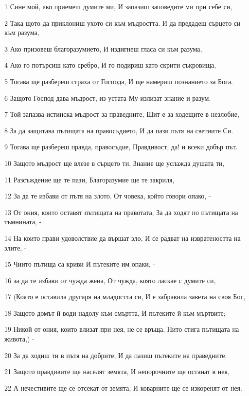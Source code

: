 \par 1 Сине мой, ако приемеш думите ми, И запазиш заповедите ми при себе си,
\par 2 Така щото да приклониш ухото си към мъдростта. И да предадеш сърцето си към разума,
\par 3 Ако призовеш благоразумието, И издигнеш гласа си към разума,
\par 4 Ако го потърсиш като сребро, И го подириш като скрити съкровища,
\par 5 Тогава ще разбереш страха от Господа, И ще намериш познанието за Бога.
\par 6 Защото Господ дава мъдрост, из устата Му излизат знание и разум.
\par 7 Той запазва истинска мъдрост за праведните, Щит е за ходещите в незлобие,
\par 8 За да защитава пътищата на правосъдието, И да пази пътя на светиите Си.
\par 9 Тогава ще разбереш правда, правосъдие, Правдивост, да! и всеки добър път.
\par 10 Защото мъдрост ще влезе в сърцето ти, Знание ще услажда душата ти,
\par 11 Разсъждение ще те пази, Благоразумие ще те закриля,
\par 12 За да те избави от пътя на злото. От човека, който говори опако, -
\par 13 От ония, които оставят пътищата на правотата, За да ходят по пътищата на тъмнината, -
\par 14 На които прави удоволствие да вършат зло, И се радват на извратеността на злите, -
\par 15 Чиито пътища са криви И пътеките им опаки, -
\par 16 за да те избави от чужда жена, От чужда, която ласкае с думите си,
\par 17 (Която е оставила другаря на младостта си, И е забравила завета на своя Бог,
\par 18 Защото домът й води надолу към смъртта, И пътеките й към мъртвите;
\par 19 Никой от ония, които влизат при нея, не се връща, Нито стига пътищата на живота,) -
\par 20 За да ходиш ти в пътя на добрите, И да пазиш пътеките на праведните.
\par 21 Защото правдивите ще населят земята, И непорочните ще останат в нея,
\par 22 А нечестивите ще се отсекат от земята, И коварните ще се изкоренят от нея.

